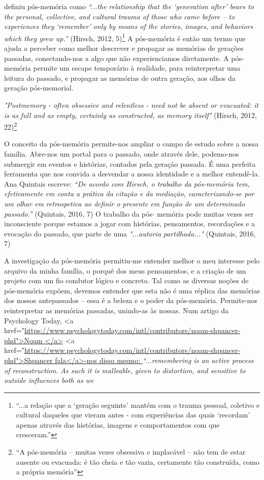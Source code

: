 \documentclass{article}
\begin{document}
definiu pós-memória como \textit{“...the relationship that the ‘generation after’ bears to the }
\textit{personal, collective, and cultural trauma of those who came before – to experiences they }
\textit{‘remember’ only by means of the stories, images, and behaviors which they grew up.”} 
(Hirsch, 2012, 5)\footnote{“...a relação que a ‘geração seguinte’ mantém com o trauma pessoal, coletivo e cultural daqueles que vieram antes - com experiências das quais ‘recordam’ apenas através das histórias, imagens e comportamentos com que cresceram.” } A pós-memória é então um termo que ajuda a perceber como melhor 
descrever e propagar as memórias de gerações passadas, conectando-nos a algo que não 
experienciamos diretamente. A pós-memória permite um escape temporário à realidade, 
para reinterpretar uma leitura do passado, e propagar as memórias de outra geração, aos 
olhos da geração pós-memorial.  
 
\textit{"Postmemory - often obsessive and relentless - need not be absent or evacuated: it is as }
\textit{full and as empty, certainly as constructed, as memory itself"} (Hirsch, 2012, 22)\footnote{“A pós-memória – muitas vezes obsessiva e implacável – não tem de estar ausente ou evacuada: é tão cheia e tão vazia, certamente tão construída, como a própria memória” } 
 
O conceito da pós-memória permite-nos ampliar o campo de estudo sobre a nossa 
família. Abre-nos um portal para o passado, onde através dele, podemo-nos submergir em 
eventos e histórias, contados pela geração passada. É uma perfeita ferramenta que nos 
convida a desvendar a nossa identidade e a melhor entendê-la. Ana Quintais escreve: \textit{“De }
\textit{acordo com Hirsch, o trabalho da pós-memória tem, efetivamente em conta a prática da }
\textit{citação  e  da  mediação,  caracterizando-se  por  um  olhar  em  retrospetiva  ao  definir  o }
\textit{presente em função de um determinado passado.”} (Quintais, 2016, 7) O trabalho da pós-
memória  pode  muitas  vezes  ser  inconsciente  porque  estamos  a  jogar  com  histórias, 
pensamentos,  recordações  e  a  evocação  do  passado,  que  parte  de  uma  \textit{"...autoria }
\textit{partilhada..."} (Quintais, 2016, 7) 
 
A  investigação  da  pós-memória  permitiu-me  entender  melhor  o  meu  interesse 
pelo arquivo da minha família, o porquê dos meus pensamentos, e a criação de um projeto 
com um fio condutor lógico e concreto. Tal como as diversas noções de pós-memória 
expõem,  devemos  entender  que  esta  não  é  uma  réplica  das  memórias  dos  nossos 
antepassados – essa é a beleza e o poder da pós-memória. Permite-nos reinterpretar as 
memórias  passadas,  unindo-as  às  nossas.  Num  artigo  da  Psychology  Today,  <a href="\url{https://www.psychologytoday.com/intl/contributors/noam-shpancer-phd">Noam </a>}
<a href="\url{https://www.psychologytoday.com/intl/contributors/noam-shpancer-phd">Shpancer fala</a>-nos disso mesmo: }\textit{“...remembering is an active process of reconstruction. }
\textit{As such it is malleable, given to distortion, and sensitive to outside influences both as we }
 
\end{document}
